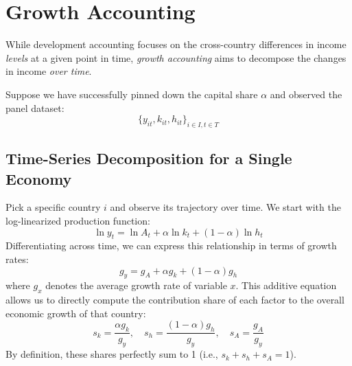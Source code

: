\section{Growth Accounting}

While development accounting focuses on the cross-country differences in income \textit{levels} at a given point in time, \textit{growth accounting} aims to decompose the changes in income \textit{over time}. 

Suppose we have successfully pinned down the capital share $\alpha$ and observed the panel dataset:
\[
\{y_{it}, k_{it}, h_{it}\}_{i\in I, t\in T}
\]

\subsection{Time-Series Decomposition for a Single Economy}

Pick a specific country $i$ and observe its trajectory over time. We start with the log-linearized production function:
\[
\ln y_{t} = \ln A_t + \alpha \ln k_t + (1-\alpha) \ln h_t
\]
Differentiating across time, we can express this relationship in terms of growth rates:
\[
g_y = g_A + \alpha g_k + (1-\alpha) g_h
\]
where $g_x$ denotes the average growth rate of variable $x$. This additive equation allows us to directly compute the contribution share of each factor to the overall economic growth of that country:
\[
s_k = \frac{\alpha g_k}{g_y}, \quad s_h = \frac{(1-\alpha) g_h}{g_y}, \quad s_A = \frac{g_A}{g_y}
\]
By definition, these shares perfectly sum to 1 (i.e., $s_k + s_h + s_A = 1$).

